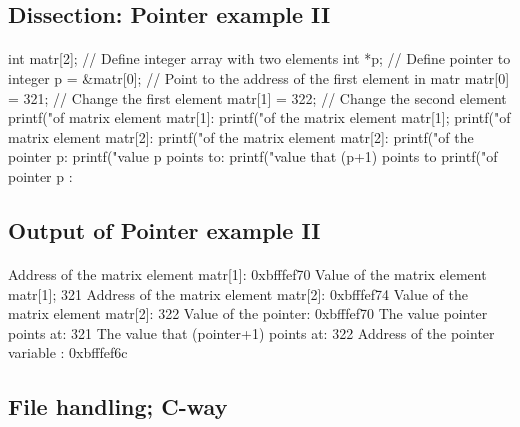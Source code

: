 \documentclass[%
twoside,                 %
final,                   %
10pt]{article}
\newenvironment{paragraphadmon}[1][]{\paragraph{#1}}{}
\begin{document}
\subsection{Dissection: Pointer example II}


\begin{paragraphadmon}[]
\bcppcod
int matr[2];    // Define integer array with two elements
int *p;         // Define pointer to integer
p = &matr[0];   // Point to the address of the first element in matr
matr[0] = 321;  // Change the first element
matr[1] = 322;  // Change the second element
printf("\nAddress of matrix element matr[1]: %
printf("\nValue of the  matrix element  matr[1]; %
printf("\nAddress of matrix element matr[2]: %
printf("\nValue of the matrix element  matr[2]: %
printf("\nValue of the pointer p: %
printf("\nThe value p points to: %
printf("\nThe value that (p+1) points to  %
printf("\nAddress of pointer p : %
\ecppcod
\end{paragraphadmon}




\subsection{Output of Pointer example II}


\begin{paragraphadmon}[]
\bccq
Address of the matrix element matr[1]: 0xbfffef70
Value of the  matrix element  matr[1]; 321
Address of the matrix element matr[2]: 0xbfffef74
Value of the matrix element  matr[2]: 322
Value of the pointer: 0xbfffef70
The value pointer points at: 321
The value that (pointer+1) points at:  322
Address of the pointer variable : 0xbfffef6c
\eccq
\end{paragraphadmon}



\subsection{File handling; C-way}
\end{document}
